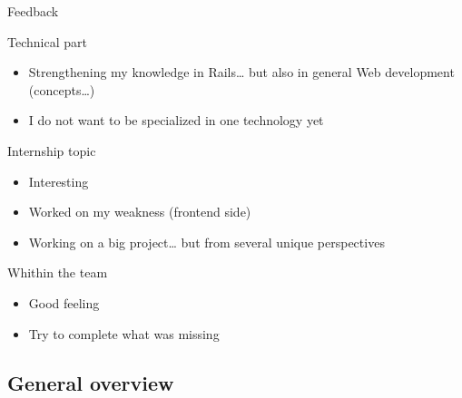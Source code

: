 \documentclass[10pt,a4paper]{beamer}
\begin{document}
\begin{frame}{Feedback}
  \begin{block}{Technical part}
    \begin{itemize}
      \item Strengthening my knowledge in Rails… but also in general Web development (concepts…)
      \item I do not want to be specialized in one technology yet
    \end{itemize}
  \end{block}
  
  \begin{block}{Internship topic}
    \begin{itemize}
      \item Interesting
      \item Worked on my weakness (frontend side)
      \item Working on a big project… but from several unique perspectives
    \end{itemize}
  \end{block}
  
  \begin{block}{Whithin the team}
    \begin{itemize}
      \item Good feeling
      \item Try to complete what was missing
    \end{itemize}
  \end{block}
\end{frame}

\subsection{General overview}
\end{document}
